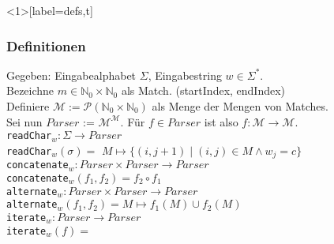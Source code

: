 \documentclass{beamer}
\begin{document}
    \begin{frame}<1>[label=defs,t]
        \frametitle{Definitionen}
        Gegeben: Eingabealphabet $\Sigma$, Eingabestring $w \in \Sigma^*$.\\[10pt]
        \pause
        Bezeichne $m \in \mathbb{N}_0 \times \mathbb{N}_0$ als Match. \hfill(startIndex, endIndex)\\
        Definiere $\mathcal{M} := \mathcal{P}(\mathbb{N}_0 \times \mathbb{N}_0)$ als Menge der Mengen
        von Matches.\\[10pt]
        \pause
        Sei nun $Parser$ := $\mathcal{M}^\mathcal{M}$.
        Für $f \in Parser$ ist also $f : \mathcal{M} \to \mathcal{M}$.\\[10pt]
        \pause
        \texttt{readChar}$_w : \Sigma \to Parser$\\
        \texttt{readChar}$_w(\sigma) =$
        \pause
        \pause
        $M \mapsto \{(i, j+1) \mid (i,j) \in M \land w_j = c\}$\\[10pt]
        \texttt{concatenate}$_w : Parser \times Parser \to Parser$\\
        \pause
        \texttt{concatenate}$_w(f_1,f_2) = f_2 \circ f_1$\\[10pt]
        \pause
        \texttt{alternate}$_w : Parser \times Parser \to Parser$\\
        \pause
        \texttt{alternate}$_w(f_1,f_2) = M \mapsto f_1(M) \cup f_2(M)$\\[10pt]
        \pause
        \texttt{iterate}$_w : Parser \to Parser$\\
        \texttt{iterate}$_w(f) =$
        \pause
    \end{frame}

\end{document}
